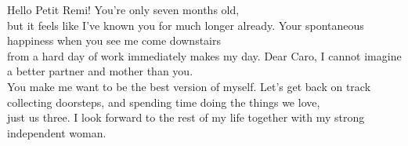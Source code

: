 Hello Petit Remi! You're only seven months old,\\but it feels like I've known you for much longer already.
Your spontaneous happiness when you see me come downstairs\\from a hard day of work immediately makes my day.
Dear Caro, I cannot imagine a better partner and mother than you.\\You make me want to be the best version of myself.
Let's get back on track collecting doorsteps, and spending time doing the things we love,\\just us three. I look forward to the rest of my life together with my strong independent woman.


























































































